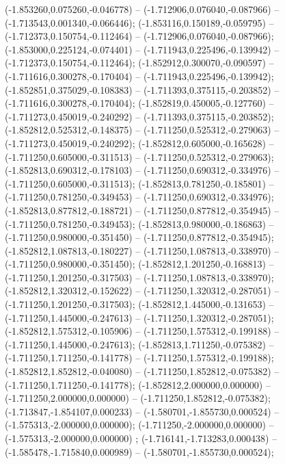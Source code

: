  (-1.853260,0.075260,-0.046778) -- (-1.712906,0.076040,-0.087966) -- (-1.713543,0.001340,-0.066446);
 (-1.853116,0.150189,-0.059795) -- (-1.712373,0.150754,-0.112464) -- (-1.712906,0.076040,-0.087966);
 (-1.853000,0.225124,-0.074401) -- (-1.711943,0.225496,-0.139942) -- (-1.712373,0.150754,-0.112464);
 (-1.852912,0.300070,-0.090597) -- (-1.711616,0.300278,-0.170404) -- (-1.711943,0.225496,-0.139942);
 (-1.852851,0.375029,-0.108383) -- (-1.711393,0.375115,-0.203852) -- (-1.711616,0.300278,-0.170404);
 (-1.852819,0.450005,-0.127760) -- (-1.711273,0.450019,-0.240292) -- (-1.711393,0.375115,-0.203852);
 (-1.852812,0.525312,-0.148375) -- (-1.711250,0.525312,-0.279063) -- (-1.711273,0.450019,-0.240292);
 (-1.852812,0.605000,-0.165628) -- (-1.711250,0.605000,-0.311513) -- (-1.711250,0.525312,-0.279063);
 (-1.852813,0.690312,-0.178103) -- (-1.711250,0.690312,-0.334976) -- (-1.711250,0.605000,-0.311513);
 (-1.852813,0.781250,-0.185801) -- (-1.711250,0.781250,-0.349453) -- (-1.711250,0.690312,-0.334976);
 (-1.852813,0.877812,-0.188721) -- (-1.711250,0.877812,-0.354945) -- (-1.711250,0.781250,-0.349453);
 (-1.852813,0.980000,-0.186863) -- (-1.711250,0.980000,-0.351450) -- (-1.711250,0.877812,-0.354945);
 (-1.852812,1.087813,-0.180227) -- (-1.711250,1.087813,-0.338970) -- (-1.711250,0.980000,-0.351450);
 (-1.852812,1.201250,-0.168813) -- (-1.711250,1.201250,-0.317503) -- (-1.711250,1.087813,-0.338970);
 (-1.852812,1.320312,-0.152622) -- (-1.711250,1.320312,-0.287051) -- (-1.711250,1.201250,-0.317503);
 (-1.852812,1.445000,-0.131653) -- (-1.711250,1.445000,-0.247613) -- (-1.711250,1.320312,-0.287051);
 (-1.852812,1.575312,-0.105906) -- (-1.711250,1.575312,-0.199188) -- (-1.711250,1.445000,-0.247613);
 (-1.852813,1.711250,-0.075382) -- (-1.711250,1.711250,-0.141778) -- (-1.711250,1.575312,-0.199188);
 (-1.852812,1.852812,-0.040080) -- (-1.711250,1.852812,-0.075382) -- (-1.711250,1.711250,-0.141778);
 (-1.852812,2.000000,0.000000) -- (-1.711250,2.000000,0.000000) -- (-1.711250,1.852812,-0.075382);
 (-1.713847,-1.854107,0.000233) -- (-1.580701,-1.855730,0.000524) -- (-1.575313,-2.000000,0.000000);
 (-1.711250,-2.000000,0.000000) -- (-1.575313,-2.000000,0.000000) ;
 (-1.716141,-1.713283,0.000438) -- (-1.585478,-1.715840,0.000989) -- (-1.580701,-1.855730,0.000524);
